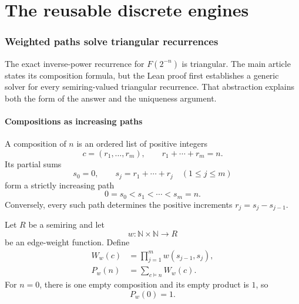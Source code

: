 \documentclass[11pt,oneside]{article}
\theoremstyle{definition}
\theoremstyle{remark}
\newcommand{\N}{\mathbb N}
\begin{document}
\part{The reusable discrete engines}

\section{Weighted paths solve triangular recurrences}
\label{sec:path-sums}

The exact inverse-power recurrence for $F(2^{-n})$ is triangular.  The main article states its
composition formula, but the Lean proof first establishes a generic solver for every
semiring-valued triangular recurrence.  That abstraction explains both the form of the
answer and the uniqueness argument.

\subsection{Compositions as increasing paths}

A composition of $n$ is an ordered list of positive integers
\begin{equation}
 c=(r_1,\ldots,r_m),
 \qquad
 r_1+\cdots+r_m=n.
 \label{eq:composition}
\end{equation}
Its partial sums
\begin{equation}
 s_0=0,
 \qquad
 s_j=r_1+\cdots+r_j
 \quad(1\le j\le m)
 \label{eq:composition-partial-sums}
\end{equation}
form a strictly increasing path
\begin{equation}
 0=s_0<s_1<\cdots<s_m=n.
 \label{eq:increasing-path}
\end{equation}
Conversely, every such path determines the positive increments $r_j=s_j-s_{j-1}$.

Let $R$ be a semiring and let
\begin{equation}
 w:\N\times\N\to R
 \label{eq:generic-edge-weight}
\end{equation}
be an edge-weight function.  Define
\begin{align}
 W_w(c)&=\prod_{j=1}^{m}w(s_{j-1},s_j),                    \label{eq:path-weight}\\
 P_w(n)&=\sum_{c\models n}W_w(c).                          \label{eq:path-sum}
\end{align}
For $n=0$, there is one empty composition and its empty product is $1$, so
\begin{equation}
 P_w(0)=1.
 \label{eq:path-sum-zero}
\end{equation}
\end{document}
